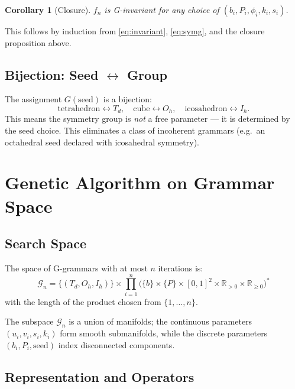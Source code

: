 \documentclass[11pt, a4paper]{article}
\newtheorem{corollary}{Corollary}[section]
\newcommand{\R}{\mathbb{R}}
\newcommand{\Td}{T_d}
\newcommand{\Oh}{O_h}
\newcommand{\Ih}{I_h}
\begin{document}
\begin{corollary}[Closure]
$f_n$ is G-invariant for any choice of $(b_i, P_i, \phi_i, k_i, s_i)$.
\end{corollary}
This follows by induction from \cref{eq:invariant}, \cref{eq:symg}, and the
closure proposition above.

\subsection{Bijection: Seed $\leftrightarrow$ Group}

The assignment $G(\mathrm{seed})$ is a bijection:
\begin{equation}
  \mathrm{tetrahedron} \leftrightarrow \Td, \quad
  \mathrm{cube} \leftrightarrow \Oh, \quad
  \mathrm{icosahedron} \leftrightarrow \Ih.
\end{equation}
This means the symmetry group is \emph{not} a free parameter — it is
determined by the seed choice. This eliminates a class of incoherent grammars
(e.g.\ an octahedral seed declared with icosahedral symmetry).

\section{Genetic Algorithm on Grammar Space}
\label{sec:ga}

\subsection{Search Space}

The space of G-grammars with at most $n$ iterations is:
\begin{equation}
  \mathcal{G}_n = \{(\Td, \Oh, \Ih)\} \times \prod_{i=1}^{n}
    \bigl(\{b\} \times \{P\} \times [0,1]^2 \times \R_{>0} \times \R_{\geq 0}\bigr)^*
\end{equation}
with the length of the product chosen from $\{1, \ldots, n\}$.

The subspace $\mathcal{G}_n$ is a union of manifolds; the continuous parameters
$(u_i, v_i, s_i, k_i)$ form smooth submanifolds, while the discrete
parameters $(b_i, P_i, \mathrm{seed})$ index disconnected components.

\subsection{Representation and Operators}
\end{document}

